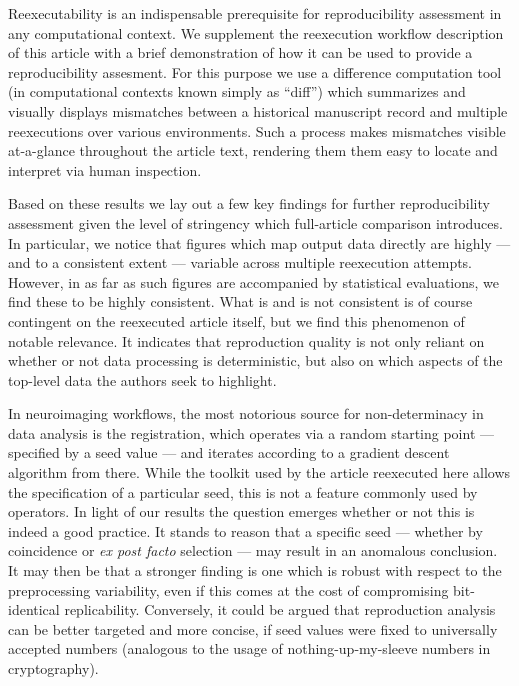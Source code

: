 Reexecutability is an indispensable prerequisite for reproducibility assessment in any computational context.
We supplement the reexecution workflow description of this article with a brief demonstration of how it can be used to provide a reproducibility assesment.
For this purpose we use a difference computation tool (in computational contexts known simply as “diff”) which summarizes and visually displays mismatches between a historical manuscript record and multiple reexecutions over various environments.
Such a process makes mismatches visible at-a-glance throughout the article text, rendering them them easy to locate and interpret via human inspection.

Based on these results we lay out a few key findings for further reproducibility assessment given the level of stringency which full-article comparison introduces.
In particular, we notice that figures which map output data directly are highly — and to a consistent extent — variable across multiple reexecution attempts.
However, in as far as such figures are accompanied by statistical evaluations, we find these to be highly consistent.
What is and is not consistent is of course contingent on the reexecuted article itself, but we find this phenomenon of notable relevance.
It indicates that reproduction quality is not only reliant on whether or not data processing is deterministic, but also on which aspects of the top-level data the authors seek to highlight.

In neuroimaging workflows, the most notorious source for non-determinacy in data analysis is the registration, which operates via a random starting point — specified by a seed value — and iterates according to a gradient descent algorithm from there.
While the toolkit used by the article reexecuted here allows the specification of a particular seed, this is not a feature commonly used by operators.
In light of our results the question emerges whether or not this is indeed a good practice.
It stands to reason that a specific seed — whether by coincidence or \textit{ex post facto} selection — may result in an anomalous conclusion.
It may then be that a stronger finding is one which is robust with respect to the preprocessing variability, even if this comes at the cost of compromising bit-identical replicability.
Conversely, it could be argued that reproduction analysis can be better targeted and more concise, if seed values were fixed to universally accepted numbers (analogous to the usage of nothing-up-my-sleeve numbers in cryptography).

